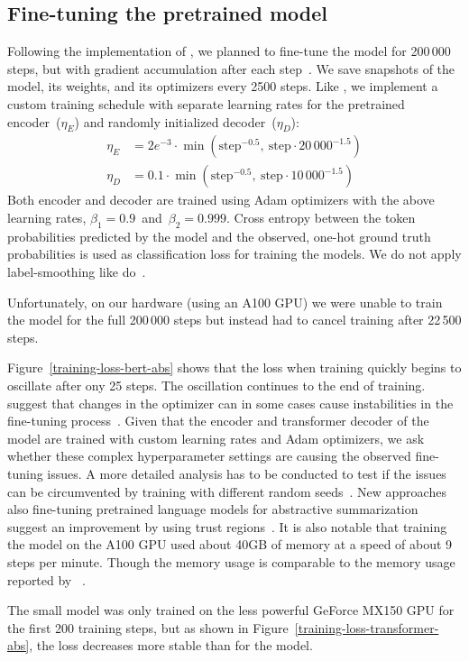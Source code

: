 \subsection{Fine-tuning the pretrained model}

Following the implementation of \cite{LiuL2019}, we planned to fine-tune the \BertSumAbs model for 200\,000 steps, but with gradient accumulation after each step~\cite{LiuL2019}. We save snapshots of the model, its weights, and its optimizers every 2500 steps.
Like \citeauthor{LiuL2019}, we implement a custom training schedule with separate learning rates for the pretrained encoder~(\(\eta_E\)) and randomly initialized decoder~(\(\eta_D\)):
\begin{align*}
    \eta_E &= 2e^{-3} \cdot \min( \text{step}^{-0.5},\ \text{step} \cdot 20\,000^{-1.5} ) \\
    \eta_D &= 0.1 \cdot \min( \text{step}^{-0.5},\ \text{step} \cdot 10\,000^{-1.5} )
\end{align*}
Both encoder and decoder are trained using Adam optimizers with the above learning rates, \(\beta_1 = 0.9\)~and~\(\beta_2 = 0.999\).
Cross entropy between the token probabilities predicted by the model and the observed, one-hot ground truth probabilities is used as classification loss for training the models. We do not apply label-smoothing like \citeauthor{LiuL2019} do~\cite{LiuL2019}.

Unfortunately, on our hardware (using an A100 GPU) we were unable to train the model for the full 200\,000 steps but instead had to cancel training after 22\,500 steps.

Figure~\ref{training-loss-bert-abs} shows that the loss when training \BertSumAbs quickly begins to oscillate after ony 25 steps. The oscillation continues to the end of training.
\citeauthor{ZhangWKWA2020} suggest that changes in the optimizer can in some cases cause instabilities in the fine-tuning process~\cite{ZhangWKWA2020}.
Given that the \Bert encoder and transformer decoder of the \BertSumAbs model are trained with custom learning rates and Adam optimizers, we ask whether these complex hyperparameter settings are causing the observed fine-tuning issues.
A more detailed analysis has to be conducted to test if the issues can be circumvented by training with different random seeds~\cite{DodgeISFHS2020}.
New approaches also fine-tuning pretrained language models for abstractive summarization suggest an improvement by using trust regions~\cite{AghajanyanSGGZG2020}.
It is also notable that training the \BertSumAbs model on the A100 GPU used about 40GB of memory at a speed of about 9 steps per minute.
Though the memory usage is comparable to the memory usage reported by \citeauthor{LiuL2019}~\cite{LiuL2019}.

The small \TransformerAbsTiny model was only trained on the less powerful GeForce MX150 GPU for the first 200 training steps, but as shown in Figure~\ref{training-loss-transformer-abs}, the loss decreases more stable than for the \BertSumAbs model.

